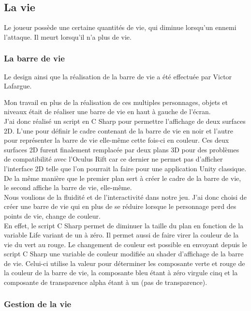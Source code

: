 \documentclass[12pt]{article}
\begin{document}
\newpage

\subsection{La vie}

Le joueur possède une certaine quantités de vie, qui diminue lorsqu'un ennemi l'attaque. Il meurt lorsqu'il n'a plus de vie.

\subsubsection{La barre de vie}

Le design ainsi que la réalisation de la barre de vie a été effectuée par Victor Lafargue.

Mon travail en plus de la réalisation de ces multiples personnages, objets et niveaux était de réaliser une barre de vie en haut à gauche de l’écran.\\
J’ai donc réalisé un script en C Sharp pour permettre l’affichage de deux surfaces 2D. L’une pour définir le cadre contenant de la barre de vie en noir et l’autre pour représenter la barre de vie elle-même cette fois-ci en couleur. Ces deux surfaces 2D furent finalement remplacée par deux plans 3D pour des problèmes de compatibilité avec l’Oculus Rift car ce dernier ne permet pas d’afficher l’interface 2D telle que l’on pourrait la faire pour une application Unity classique.\\
De la même manière que le premier plan sert à créer le cadre de la barre de vie, le second affiche la barre de vie, elle-même.\\

Nous voulions de la fluidité et de l’interactivité dans notre jeu. J’ai donc choisi de créer une barre de vie qui en plus de se réduire lorsque le personnage perd des points de vie, change de couleur.\\
En effet, le script C Sharp permet de diminuer la taille du plan en fonction de la variable Life variant de un à zéro. Il permet aussi de faire virer la couleur de la vie du vert au rouge. Le changement de couleur est possible en envoyant depuis le script C Sharp une variable de couleur modifiée au shader d’affichage de la barre de vie. Celui-ci utilise la valeur pour déterminer les composante verte et rouge de la couleur de la barre de vie, la composante bleu étant à zéro virgule cinq et la composante de transparence alpha étant à un (pas de transparence).

\subsubsection{Gestion de la vie}
\end{document}
